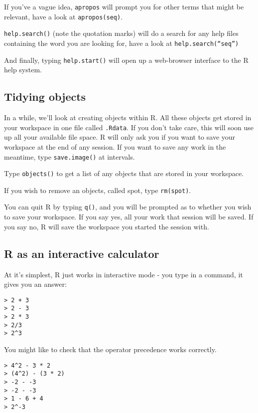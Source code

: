 If you've a vague idea, \texttt{apropos} will prompt you for other terms that might be relevant, have a look at \texttt{apropos(seq)}.


\texttt{help.search()} (note the quotation marks) will do a search for any help files containing the word you are looking for, have a look at \texttt{help.search(``seq'')}


And finally, typing \texttt{help.start()} will open up a web-browser interface to the R help system.


\subsection{Tidying objects}

In a while, we'll look at creating objects within R.   All these objects get stored in your workspace in one file called \texttt{.Rdata}.   If you don't take care, this will soon use up all your available file space.   R will only ask you if you want to save your workspace at the end of any session.   If you want to save any work in the meantime, type \texttt{save.image()} at intervals.

Type \texttt{objects()} to get a list of any objects that are stored in your workspace.   

If you wish to remove an objects, called spot, type \texttt{rm(spot)}.

You can quit R by typing \texttt{q()}, and you will be prompted as to whether you wish to save your workspace.   If you say yes, all your work that session will be saved.   If you say no, R will save the workspace you started the session with.

\subsection{R as an interactive calculator}


At it's simplest, R just works in interactive mode - you type in a command, it gives you an answer:

\begin{verbatim}
> 2 + 3
> 2 - 3
> 2 * 3
> 2/3
> 2^3
\end{verbatim}

You might like to check that the operator precedence works correctly.

\begin{verbatim}
> 4^2 - 3 * 2
> (4^2) - (3 * 2)
> -2 - -3
> -2 - -3
> 1 - 6 + 4
> 2^-3
\end{verbatim}



